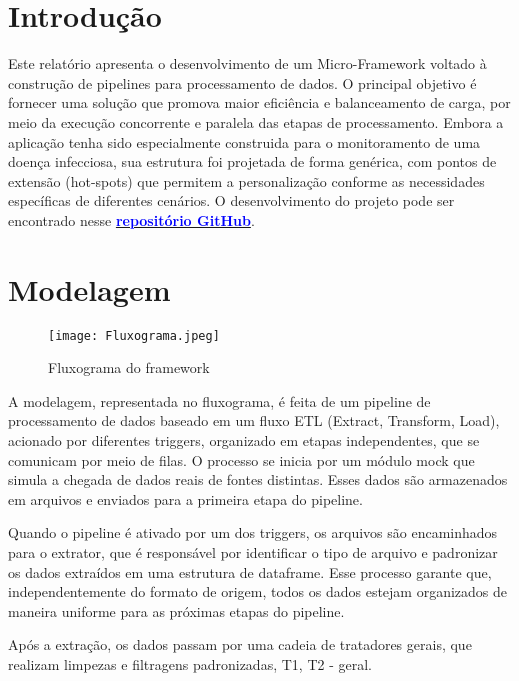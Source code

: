 \documentclass[a4paper,12pt]{article}
\begin{document}
\tableofcontents
\newpage


\section{Introdução}
Este relatório apresenta o desenvolvimento de um Micro-Framework voltado à construção de pipelines para processamento de dados. O principal objetivo é fornecer uma solução que promova maior eficiência e balanceamento de carga, por meio da execução concorrente e paralela das etapas de processamento. Embora a aplicação tenha sido especialmente construida para o monitoramento de uma doença infecciosa, sua estrutura foi projetada de forma genérica, com pontos de extensão (hot-spots) que permitem a personalização conforme as necessidades específicas de diferentes cenários. O desenvolvimento do projeto pode ser encontrado nesse \href{https://github.com/eduardammag/ScalableComputingA1}{\textcolor{blue}{\textbf{repositório GitHub}}}.

\section{Modelagem}

\begin{figure}[H]
    \hspace{-1cm}
    \texttt{[image: Fluxograma.jpeg]}
    \caption{Fluxograma do framework}
    \label{fig:minha_imagem}
\end{figure}

A modelagem, representada no fluxograma, é feita de um pipeline de processamento de dados baseado em um fluxo ETL (Extract, Transform, Load), acionado por diferentes triggers, organizado em etapas independentes, que se comunicam por meio de filas. O processo se inicia por um módulo mock que simula a chegada de dados reais de fontes distintas. Esses dados são armazenados em arquivos e enviados para a primeira etapa do pipeline.

Quando o pipeline é ativado por um dos triggers, os arquivos são encaminhados para o extrator, que é responsável por identificar o tipo de arquivo e padronizar os dados extraídos em uma estrutura de dataframe. Esse processo garante que, independentemente do formato de origem, todos os dados estejam organizados de maneira uniforme para as próximas etapas do pipeline.

Após a extração, os dados passam por uma cadeia de tratadores gerais, que realizam limpezas e filtragens padronizadas, T1, T2 - geral.
\end{document}
